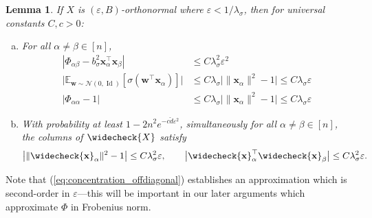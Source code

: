 \documentclass{article}
\newtheorem{lemma}[theorem]{Lemma}
\theoremstyle{definition}
\newcommand{\N}{\mathcal{N}}
\newcommand{\E}{\mathbb{E}}
\newcommand{\Id}{\operatorname{Id}}
\newcommand{\x}{\mathbf{x}}
\newcommand{\w}{\mathbf{w}}
\renewcommand{\a}{\alpha}
\renewcommand{\b}{\beta}
\newcommand{\eps}{\varepsilon}
\newcommand{\vd}{\check{d}}
\newcommand{\vX}{\widecheck{X}}
\newcommand{\vx}{\widecheck{\mathbf{x}}}
\newcommand{\1}{\mathbf{1}}
\begin{document}
\begin{lemma}\label{lemma:orthog}
If $X$ is $(\eps,B)$-orthonormal where $\eps<1/\lambda_\sigma$,
then for universal constants $C,c>0$:
\begin{enumerate}[(a)]
\item For all $\a \neq \b \in [n]$,
\begin{align}
|\Phi_{\a\b}-b_\sigma^2 \x_\a^\top \x_\b| &\leq C\lambda_\sigma^2 \eps^2\label{eq:concentration_offdiagonal}\\
\Big|\E_{\w \sim \N(0,\Id)}[\sigma(\w^\top \x_\a)]\Big| &\leq C\lambda_\sigma
\Big|\|\x_\a\|^2-1\Big| \leq C\lambda_\sigma \eps\label{eq:wxbound}\\
|\Phi_{\a\a}-1| & \leq  C\lambda_\sigma
\Big|\|\x_\a\|^2-1\Big|\leq C\lambda_\sigma \eps
\label{eq:concentration_diagonal}
\end{align}
\item With probability at least $1-2n^2e^{-c\vd\eps^2}$,
simultaneously for all $\a \neq \b \in [n]$, the columns of $\vX$ satisfy
\[\big|\|\vx_\a\|^2-1\big| \leq C\lambda_\sigma^2 \eps,
\qquad \big|\vx_\a^\top \vx_\b \big| \leq C\lambda_\sigma^2 \eps.\]
\end{enumerate}
\end{lemma}
Note that (\ref{eq:concentration_offdiagonal}) establishes an approximation
which is second-order in $\eps$---this will be important in our later
arguments which approximate $\Phi$ in Frobenius norm.
\end{document}
